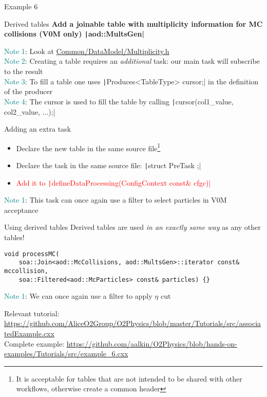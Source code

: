 \documentclass[10pt,lualatex,xcolor={table,svgnames},{hyperref={bookmarks=true,linktoc=all}},aspectratio=169]{beamer}
\newcommand{\programmatic}[1]{\textcolor{-green!40!yellow}{#1}}
\newcommand{\notion}[1]{\textcolor{teal}{#1}}
\newcommand{\codeline}[1]{{\texttt|#1|}}
\begin{document}
\begin{frame}{Example 6}
\begin{block}{Derived tables}
\textbf{Add a joinable table with multiplicity information for MC collisions (V0M only) \codeline{aod::MultsGen}}

\notion{Note 1}: Look at \href{https://github.com/AliceO2Group/O2Physics/blob/master/Common/DataModel/Multiplicity.h}{Common/DataModel/Multiplicity.h} \\
\notion{Note 2}: Creating a table requires an \emph{additional} task: our main task will subscribe to the result \\
\notion{Note 3}: To fill a table one uses \codeline{Produces<TableType> cursor;} in the definition of the producer \\
\notion{Note 4}: The \programmatic{cursor} is used to fill the table by calling \codeline{cursor(col1_value, col2_value, ...);} \\
\end{block}
\vspace{1em}
\begin{block}{Adding an extra task}
\begin{itemize}
    \item Declare the new table in the same source file\footnote{It is acceptable for tables that are not intended to be shared with other workflows, otherwise create a common header}
    \item Declare the task in the same source file: \codeline{struct PreTask {};}
    \item \textcolor{red}{Add it to \codeline{defineDataProcessing(ConfigContext const& cfgc)}}
\end{itemize}
\notion{Note 1}: This task can once again use a filter to select particles in V0M acceptance
\end{block}
\framebreak
\begin{block}{Using derived tables}
Derived tables are used \emph{in an exactly same way} as any other tables!

\begin{verbatim}
void processMC(
    soa::Join<aod::McCollisions, aod::MultsGen>::iterator const& mccollision,
    soa::Filtered<aod::McParticles> const& particles) {}
\end{verbatim}

\notion{Note 1}: We can once again use a filter to apply $\eta$ cut
\end{block}

{\footnotesize Relevant tutorial:  \href{https://github.com/AliceO2Group/O2Physics/blob/master/Tutorials/src/associatedExample.cxx}{https://github.com/AliceO2Group/O2Physics/blob/master/Tutorials/src/associatedExample.cxx} \\
    Complete example: \href{https://github.com/aalkin/O2Physics/blob/hands-on-examples/Tutorials/src/example_6.cxx}{https://github.com/aalkin/O2Physics/blob/hands-on-examples/Tutorials/src/example\_6.cxx}
}
\end{frame}
\end{document}
